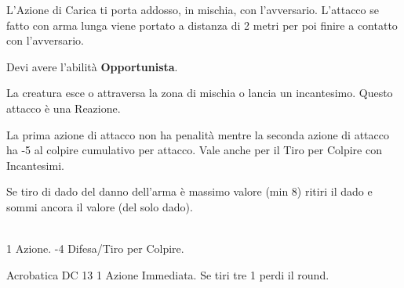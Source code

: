 \documentclass[landscape,10pt,a4paper]{article}
\begin{document}
\begin{multicols}{3}
\begin{dmbox}[title=Carica]
L'Azione di Carica ti porta addosso, in mischia, con l'avversario. L'attacco se fatto con arma lunga viene portato a distanza di 2 metri per poi finire a contatto con l'avversario.
\end{dmbox}			

\begin{dmbox}[title=Attacco di Opportunita']			
Devi avere l'abilità \textbf{Opportunista}.	

La creatura esce o attraversa la zona di mischia o lancia un incantesimo. Questo attacco è una Reazione.
\end{dmbox}			
	
\begin{dmbox}[title=Attacchi Multipli]
La prima azione di attacco non ha penalità mentre la seconda azione di attacco ha -5 al colpire cumulativo per attacco. Vale anche per il Tiro per Colpire con Incantesimi.
\end{dmbox}				
	
\begin{dmbox}[title=Esplosione del Danno]	
	Se tiro di dado del danno dell'arma è massimo valore (min 8) ritiri il dado e sommi ancora il valore (del solo dado).
\end{dmbox}

\begin{dmbox}[title=Alzarsi da prono]	
\textbf{}\\
1 Azione. -4 Difesa/Tiro per Colpire.

Acrobatica DC 13 1 Azione Immediata. Se tiri tre 1 perdi il round. 
\end{dmbox}	

\begin{dmbox}[title=Azioni per Round]	


\end{dmbox}
\end{multicols}
\end{document}
